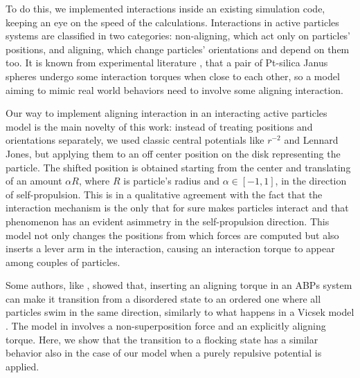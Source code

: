\documentclass[a4paper, notitlepage]{report} %
\begin{document}
	To do this, we implemented interactions inside an existing simulation code, keeping an eye on the speed of the calculations.
	Interactions in active particles systems are classified in two categories: non-aligning, which act only on particles' positions, and aligning, which change particles' orientations and depend on them too.
	It is known from experimental literature \cite{singh_pair_2024}, that a pair of Pt-silica Janus spheres undergo some interaction torques when close to each other, so a model aiming to mimic real world behaviors need to involve some aligning interaction.
	
	Our way to implement aligning interaction in an interacting active particles model is the main novelty of this work: instead of treating positions and orientations separately, we used classic central potentials like $r^{-2}$ and Lennard Jones, but applying them to an off center position on the disk representing the particle.
	The shifted position is obtained starting from the center and translating of an amount $\alpha R$, where $R$ is particle's radius and $\alpha \in [-1,1]$, in the direction of self-propulsion.
	This is in a qualitative agreement with the fact that the interaction mechanism is the only that for sure makes particles interact and that phenomenon has an evident asimmetry in the self-propulsion direction.
	This model not only changes the positions from which forces are computed but also inserts a lever arm in the interaction, causing an interaction torque to appear among couples of particles.
	
	Some authors, like \citeauthor{martin-gomez_collective_2018}, showed that, inserting an aligning torque in an ABPs system can make it transition from a disordered state to an ordered one where all particles swim in the same direction, similarly to what happens in a Vicsek model \cite{vicsek_novel_1995}.
	The model in \cite{martin-gomez_collective_2018} involves a non-superposition force and an explicitly aligning torque.
	Here, we show that the transition to a flocking state has a similar behavior also in the case of our model when a purely repulsive potential is applied.
	
\end{document}
